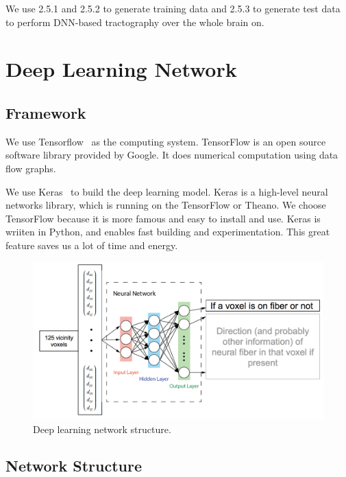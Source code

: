 \documentclass[10pt,twocolumn,letterpaper]{article}
\begin{document}
	We use 2.5.1 and 2.5.2 to generate training data and 2.5.3 to generate test data to perform DNN-based tractography over the whole brain on.
	
	
	
	\section{Deep Learning Network}
	
	\subsection{Framework}
	
	We use Tensorflow~\cite{tensorflow} as the computing system. TensorFlow is an open source software library provided by Google. It does numerical computation using data flow graphs. 
	
	We use Keras~\cite{keras} to build the deep learning model. Keras is a high-level neural networks library, which is running on the  TensorFlow or Theano. We choose TensorFlow because it is more famous and easy to install and use. Keras is wriiten in Python, and enables fast building and experimentation. This great feature saves us a lot of time and energy.
	
	\begin{figure}[!htbp]
		\begin{center}
			\includegraphics[width=0.9\linewidth]{img/6.png}
		\end{center}
		\caption{Deep learning network structure.}
		\label{fig:network}
	\end{figure}
	
	\subsection{Network Structure}
	
\end{document}
